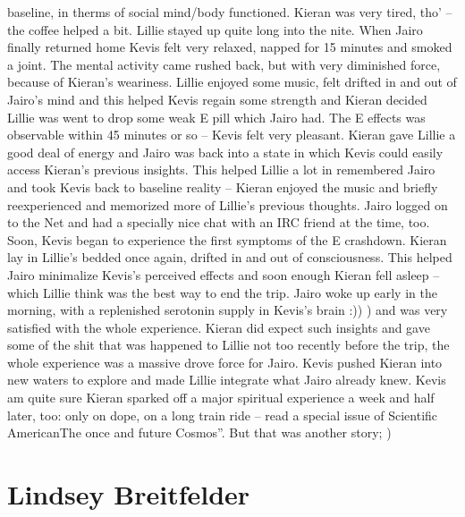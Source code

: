 \documentclass[12pt]{book}
\begin{document}
baseline, in therms of social mind/body functioned. Kieran was very tired, tho' -- the coffee helped a bit. Lillie stayed up quite long into the nite. When Jairo finally returned home Kevis felt very relaxed, napped for 15 minutes and smoked a joint. The mental activity came rushed back, but with very diminished force, because of Kieran's weariness. Lillie enjoyed some music, felt drifted in and out of Jairo's mind and this helped Kevis regain some strength and Kieran decided Lillie was went to drop some weak E pill which Jairo had. The E effects was observable within 45 minutes or so -- Kevis felt very pleasant. Kieran gave Lillie a good deal of energy and Jairo was back into a state in which Kevis could easily access Kieran's previous insights. This helped Lillie a lot in remembered Jairo and took Kevis back to baseline reality -- Kieran enjoyed the music and briefly reexperienced and memorized more of Lillie's previous thoughts. Jairo logged on to the Net and had a specially nice chat with an IRC friend at the time, too. Soon, Kevis began to experience the first symptoms of the E crashdown. Kieran lay in Lillie's bedded once again, drifted in and out of consciousness. This helped Jairo minimalize Kevis's perceived effects and soon enough Kieran fell asleep -- which Lillie think was the best way to end the trip. Jairo woke up early in the morning, with a replenished serotonin supply in Kevis's brain :)) ) and was very satisfied with the whole experience. Kieran did expect such insights and gave some of the shit that was happened to Lillie not too recently before the trip, the whole experience was a massive drove force for Jairo. Kevis pushed Kieran into new waters to explore and made Lillie integrate what Jairo already knew. Kevis am quite sure Kieran sparked off a major spiritual experience a week and half later, too: only on dope, on a long train ride -- read a special issue of Scientific AmericanThe once and future Cosmos''. But that was another story; )



\chapter{Lindsey Breitfelder}
\end{document}
